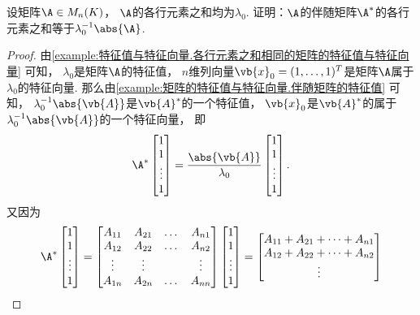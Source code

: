 \begin{example}\label{example:特征值与特征向量.各行元素之和相同的矩阵的伴随矩阵的特征值与特征向量}
设矩阵\(\A \in M_n(K)\)，
\(\A\)的各行元素之和均为\(\lambda_0\).
证明：\(\A\)的伴随矩阵\(\A^*\)的各行元素之和等于\(\lambda_0^{-1} \abs{\A}\).
\begin{proof}
由\cref{example:特征值与特征向量.各行元素之和相同的矩阵的特征值与特征向量} 可知，
\(\lambda_0\)是矩阵\(\A\)的特征值，
\(n\)维列向量\(\vb{x}_0=(1,\dotsc,1)^T\)是矩阵\(\A\)属于\(\lambda_0\)的特征向量.
那么由\cref{example:矩阵的特征值与特征向量.伴随矩阵的特征值} 可知，
\(\lambda_0^{-1} \abs{\vb{A}}\)是\(\vb{A}^*\)的一个特征值，
\(\vb{x}_0\)是\(\vb{A}^*\)的属于\(\lambda_0^{-1} \abs{\vb{A}}\)的一个特征向量，
即\begin{equation*}
	\A^*
	\begin{bmatrix}
		1 \\ 1 \\ \vdots \\ 1
	\end{bmatrix}
	= \frac{\abs{\vb{A}}}{\lambda_0}
	\begin{bmatrix}
		1 \\ 1 \\ \vdots \\ 1
	\end{bmatrix}.
\end{equation*}
又因为\begin{equation*}
	\A^*
	\begin{bmatrix}
		1 \\ 1 \\ \vdots \\ 1
	\end{bmatrix}
	= \begin{bmatrix}
		A_{11} & A_{21} & \dots & A_{n1} \\
		A_{12} & A_{22} & \dots & A_{n2} \\
		\vdots & \vdots & & \vdots \\
		A_{1n} & A_{2n} & \dots & A_{nn}
	\end{bmatrix}
	\begin{bmatrix}
		1 \\ 1 \\ \vdots \\ 1
	\end{bmatrix}
	= \begin{bmatrix}
		A_{11} + A_{21} + \dotsb + A_{n1} \\
		A_{12} + A_{22} + \dotsb + A_{n2} \\
		\vdots \\

\end{bmatrix}
\end{equation*}
\end{proof}
\end{example}
